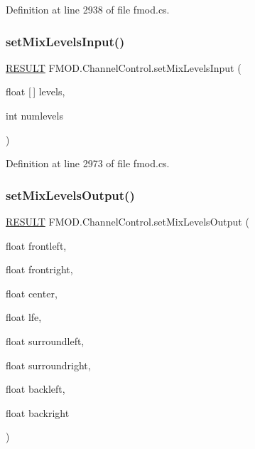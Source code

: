Definition at line 2938 of file fmod.\+cs.

\mbox{\label{class_f_m_o_d_1_1_channel_control_a88d1b4192bec02ddd3ba1029f7d31efa}} 
\subsubsection{\texorpdfstring{set\+Mix\+Levels\+Input()}{setMixLevelsInput()}}
{\footnotesize\ttfamily \hyperlink{namespace_f_m_o_d_a305d1176ef3f8c8815861a60407ac33d}{R\+E\+S\+U\+LT} F\+M\+O\+D.\+Channel\+Control.\+set\+Mix\+Levels\+Input (\begin{DoxyParamCaption}\item[{float \mbox{[}$\,$\mbox{]}}]{levels,  }\item[{int}]{numlevels }\end{DoxyParamCaption})}



Definition at line 2973 of file fmod.\+cs.

\mbox{\label{class_f_m_o_d_1_1_channel_control_a384d9495da672ce2cb78f1026dc7d980}} 
\subsubsection{\texorpdfstring{set\+Mix\+Levels\+Output()}{setMixLevelsOutput()}}
{\footnotesize\ttfamily \hyperlink{namespace_f_m_o_d_a305d1176ef3f8c8815861a60407ac33d}{R\+E\+S\+U\+LT} F\+M\+O\+D.\+Channel\+Control.\+set\+Mix\+Levels\+Output (\begin{DoxyParamCaption}\item[{float}]{frontleft,  }\item[{float}]{frontright,  }\item[{float}]{center,  }\item[{float}]{lfe,  }\item[{float}]{surroundleft,  }\item[{float}]{surroundright,  }\item[{float}]{backleft,  }\item[{float}]{backright }\end{DoxyParamCaption})}



